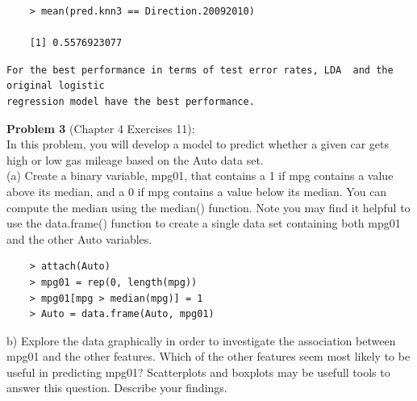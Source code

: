 \documentclass{article}
\begin{document}
\begin{program}
	\begin{verbatim}
	> mean(pred.knn3 == Direction.20092010)
	
	[1] 0.5576923077
	\end{verbatim}
\end{program}


\begin{verbatim}
For the best performance in terms of test error rates, LDA  and the original logistic 
regression model have the best performance.
\end{verbatim}

\newpage
{\bf Problem 3} (Chapter 4 Exercises 11):\\
In this problem, you will develop a model to predict whether a given car gets high or low gas mileage based on the Auto data set.\\

(a) Create a binary variable, mpg01, that contains a 1 if mpg contains a value above its median, and a 0 if mpg contains a value below its median. You can compute the median using the median() function. Note you may find it helpful to use the data.frame() function to create a single data set containing both mpg01 and the other Auto variables.

\begin{program}
	\begin{verbatim}
	> attach(Auto)
	> mpg01 = rep(0, length(mpg)) 
	> mpg01[mpg > median(mpg)] = 1 
	> Auto = data.frame(Auto, mpg01)
	\end{verbatim}
\end{program}

b) Explore the data graphically in order to investigate the association between mpg01 and the other features. Which of the other features seem most likely to be useful in predicting mpg01? Scatterplots and boxplots may be usefull tools to answer this question. Describe your findings.
\end{document}
